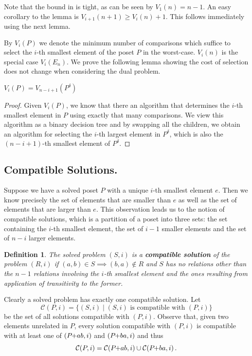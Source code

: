 \documentclass[twoside,leqno,twocolumn]{article}
\newcommand{\pchild}[3]{{#1}\kern-1pt{+}{#2}{#3}}
\newcommand{\dual}[1]{{#1}^{\delta}}
\newtheorem{definition}{Definition}[section]
\begin{document}
Note that the bound in  is tight, as can be seen by $V_1(n) = n - 1$.
An easy corollary to the lemma is $V_{i + 1}(n + 1) \ge V_i(n) + 1$.
This follows immediately using the next lemma.

By $V_i(P)$ we denote the minimum number of comparisons which suffice to select the $i$-th smallest element of the poset $P$ in the worst-case.
$V_i(n)$ is the special case $V_i(E_n)$.
We prove the following lemma showing the cost of selection does not change when considering the dual problem.

\begin{lemma} \label{lemma:dual_poset_allowed}
  $V_i(P) = V_{n - i + 1}(\dual{P})$
\end{lemma}

\begin{proof}
  Given $V_i(P)$, we know that there an algorithm that determines the $i$-th smallest element in $P$ using exactly that many comparisons.
  We view this algorithm as a binary decision tree and by swapping all the children, we obtain an algorithm for selecting the $i$-th largest element in $\dual{P}$, which is also the $(n - i + 1)$-th smallest element of $\dual{P}$.
\end{proof}

\subsection{Compatible Solutions.}
Suppose we have a solved poset $P$ with a unique $i$-th smallest element $e$.
Then we know precisely the set of elements that are smaller than $e$ as well as the set of elements that are larger than $e$.
This observation leads us to the notion of compatible solutions, which is a partition of a poset into three sets: the set containing the $i$-th smallest element, the set of $i - 1$ smaller elements and the set of $n - i$ larger elements.

\begin{definition}%
  The solved problem $(S, i)$ is a \textbf{compatible solution} of the problem $(R, i)$ if $(a, b)\in S\implies (b, a)\notin R$ and $S$ has no relations other than the $n - 1$ relations involving the $i$-th smallest element and the ones resulting from application of transitivity to the former.
\end{definition}

Clearly a solved problem has exactly one compatible solution.
Let
\begin{equation*}
  \mathcal{C}(P, i) = \{(S, i) \mid (S, i) \text{ is compatible with } (P, i) \}
\end{equation*}
be the set of all solutions compatible with $(P, i)$.
Observe that, given two elements unrelated in $P$, every solution compatible with $(P, i)$ is compatible with at least one of $(\pchild{P}{a}{b}, i)$ and $(\pchild{P}{b}{a}, i)$ and thus
\begin{equation}\label{lemma:compatible_union}
  \mathcal{C}(P, i) = \mathcal{C}(\pchild{P}{a}{b}, i) \cup \mathcal{C}(\pchild{P}{b}{a}, i)\,\text{.}
\end{equation}
\end{document}
